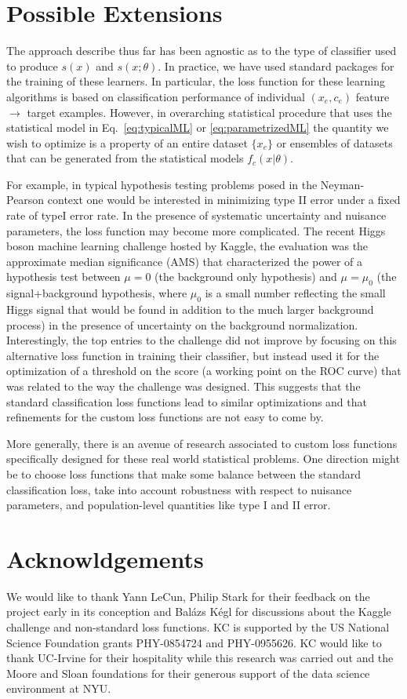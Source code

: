 \documentclass[11pt, oneside]{article}   	%
\begin{document}
\section{Possible Extensions}
The approach describe thus far has been agnostic as to the type of classifier used to produce $s(x)$ and $s(x; \theta)$. In practice, we have used standard packages for the training of these learners. In particular, the loss function for these learning algorithms is based on classification performance of individual $(x_e, c_e)$ feature $\to$ target examples. However, in overarching statistical procedure that uses the statistical model in Eq.~\ref{eq:typicalML} or \ref{eq:parametrizedML} the quantity we wish to optimize is a property of an entire dataset $\{x_e\}$ or ensembles of datasets that can be generated from the statistical models $f_c(x|\theta)$. 

For example, in typical hypothesis testing problems posed in the Neyman-Pearson context one would be interested in minimizing type II error under a fixed rate of typeI error rate. In the presence of systematic uncertainty and nuisance parameters, the loss function may become more complicated. The recent Higgs boson machine learning challenge hosted by Kaggle, the evaluation was the approximate median significance (AMS) that characterized the power of a hypothesis test between $\mu=0$ (the background only hypothesis) and $\mu=\mu_0$ (the signal+background hypothesis, where $\mu_0$ is a small number reflecting the small Higgs signal that would be found in addition to the much larger background process) in the presence of uncertainty on the background normalization. 
Interestingly, the top entries to the challenge did not improve by focusing on this alternative loss function 
in training their classifier, but instead used it for the optimization of a threshold on the score (a working point on the ROC curve) that was related to the way the challenge was designed. This suggests that the standard 
classification loss functions lead to similar optimizations and that refinements for the custom loss functions
are not easy to come by.

More generally, there is an avenue of research associated to custom loss functions specifically designed 
for these real world statistical problems. One direction might be to choose loss functions that make 
some balance between the standard classification loss, take into account robustness with respect to nuisance parameters, and population-level quantities like type I and II error.

\section*{Acknowldgements}
We would like to thank Yann LeCun, Philip Stark for their feedback on the
project early in its conception and Bal\'azs K\'egl for discussions about the Kaggle challenge and 
non-standard loss functions.
KC is supported by the US National Science Foundation grants PHY-0854724 and PHY-0955626. 
KC would like to thank UC-Irvine for their hospitality while this research was carried out and the 
Moore and Sloan foundations for their generous support of the data science environment at NYU.
\end{document}
